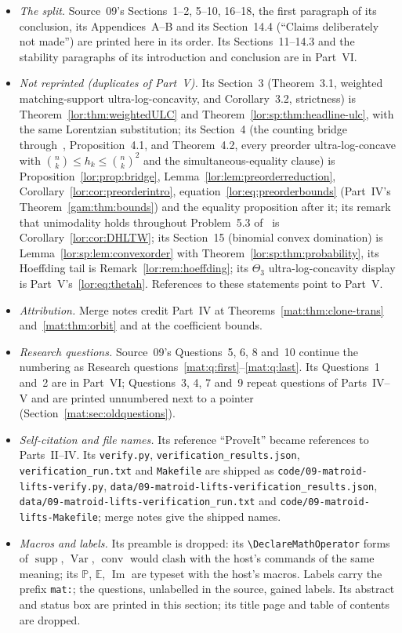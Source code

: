 \documentclass[11pt]{article}
\numberwithin{equation}{section}
\theoremstyle{definition}
\newcommand{\conv}{\operatorname{conv}}
\newcommand{\supp}{\operatorname{supp}}
\newcommand{\Var}{\operatorname{Var}}
\begin{document}
\begin{itemize}[leftmargin=1.4em]
\item \emph{The split.} Source~09's Sections~1--2, 5--10, 16--18, the
first paragraph of its conclusion, its Appendices~A--B and its
Section~14.4 (``Claims deliberately not made'') are printed here in its
order. Its Sections~11--14.3 and the stability paragraphs of its
introduction and conclusion are in Part~VI.
\item \emph{Not reprinted (duplicates of Part~V).} Its Section~3
(Theorem~3.1, weighted matching-support ultra-log-concavity, and
Corollary~3.2, strictness) is Theorem~\ref{lor:thm:weightedULC} and
Theorem~\ref{lor:sp:thm:headline-ulc}, with the same Lorentzian substitution;
its Section~4 (the counting bridge through~\cite{DHLTW,DK}, Proposition~4.1,
and Theorem~4.2, every preorder ultra-log-concave with
$\binom nk\le h_k\le\binom nk^2$ and the simultaneous-equality clause) is
Proposition~\ref{lor:prop:bridge}, Lemma~\ref{lor:lem:preorderreduction},
Corollary~\ref{lor:cor:preorderintro}, equation~\eqref{lor:eq:preorderbounds}
(Part~IV's Theorem~\ref{gam:thm:bounds}) and the equality proposition after
it; its remark that unimodality holds throughout Problem~5.3 of~\cite{DHLTW}
is Corollary~\ref{lor:cor:DHLTW}; its Section~15 (binomial convex
domination) is Lemma~\ref{lor:sp:lem:convexorder} with
Theorem~\ref{lor:sp:thm:probability}, its Hoeffding tail is
Remark~\ref{lor:rem:hoeffding}; its $\Theta_3$ ultra-log-concavity display is
Part~V's~\eqref{lor:eq:thetah}. References to these statements point to
Part~V.
\item \emph{Attribution.} Merge notes credit Part~IV at
Theorems~\ref{mat:thm:clone-trans} and~\ref{mat:thm:orbit} and at the
coefficient bounds.
\item \emph{Research questions.} Source~09's Questions~5, 6, 8 and~10
continue the numbering as Research
questions~\ref{mat:q:first}--\ref{mat:q:last}. Its Questions~1 and~2 are in
Part~VI; Questions~3, 4, 7 and~9 repeat questions of Parts~IV--V and are
printed unnumbered next to a pointer (Section~\ref{mat:sec:oldquestions}).
\item \emph{Self-citation and file names.} Its reference ``ProveIt''
became references to Parts~II--IV. Its \nolinkurl{verify.py},
\nolinkurl{verification_results.json}, \nolinkurl{verification_run.txt} and
\nolinkurl{Makefile} are shipped as \nolinkurl{code/09-matroid-lifts-verify.py},
\nolinkurl{data/09-matroid-lifts-verification_results.json},
\nolinkurl{data/09-matroid-lifts-verification_run.txt} and
\nolinkurl{code/09-matroid-lifts-Makefile}; merge notes give the shipped
names.
\item \emph{Macros and labels.} Its preamble is dropped: its
\verb|\DeclareMathOperator| forms of $\supp$, $\Var$, $\conv$ would clash
with the host's commands of the same meaning; its $\mathbb P$, $\mathbb E$,
$\operatorname{Im}$ are typeset with the host's macros. Labels carry the
prefix \texttt{mat:}; the questions, unlabelled in the source, gained
labels. Its abstract and status box are printed in this section; its title
page and table of contents are dropped.
\end{itemize}
\end{document}
